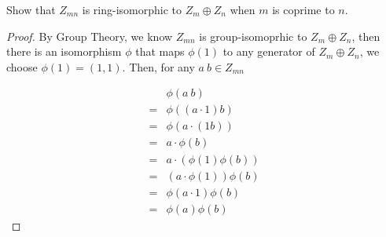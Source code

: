 \documentclass[../main.tex]{subfiles}
\begin{document}
\setcounter{exercise}{56}
\begin{exercise}
  Show that $Z_{mn}$ is ring-isomorphic to $Z_m \oplus Z_n$ when $m$ is coprime to $n$.
\end{exercise}
\begin{proof}
  By Group Theory, we know $Z_{mn}$ is group-isomoprhic to $Z_m \oplus Z_n$,
  then there is an isomorphism $\phi$ that maps $\phi(1)$ to any generator of $Z_m \oplus Z_n$,
  we choose $\phi(1) = (1, 1)$. Then, for any $a \ b \in Z_{mn}$

  \begin{align*}
     & \phi(a \ b) \\
    =& \phi( (a \cdot 1) b) \\
    =& \phi( a \cdot (1b)) \\
    =& a \cdot \phi(b) \\
    =& a \cdot (\phi(1) \phi(b)) \\
    =& (a \cdot \phi(1)) \phi(b) \\
    =& \phi(a \cdot 1) \phi(b) \\
    =& \phi(a) \phi(b)
  \end{align*}
\end{proof}
\end{document}
